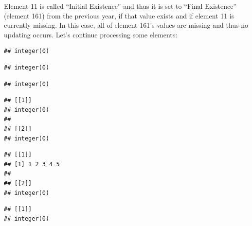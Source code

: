\documentclass[nojss]{jss}
\begin{document}
Element 11 is called ``Initial Existence'' and thus it is set to
``Final Existence'' (element 161) from the previous year, if that value exists
and if element 11 is currently missing.  In this case, all of element 161's
values are missing and thus no updating occurs.  Let's continue processing some
elements:

\begin{knitrout}
\color{fgcolor}\begin{kframe}
\begin{alltt}
\hlstd{(}   
\end{alltt}
\begin{verbatim}
## integer(0)
\end{verbatim}
\begin{alltt}
\hlstd{(}   
\end{alltt}
\begin{verbatim}
## integer(0)
\end{verbatim}
\begin{alltt}
\hlstd{(}   
\end{alltt}
\begin{verbatim}
## integer(0)
\end{verbatim}
\begin{alltt}
\hlstd{(}   
\end{alltt}
\begin{verbatim}
## [[1]]
## integer(0)
## 
## [[2]]
## integer(0)
\end{verbatim}
\begin{alltt}
\hlstd{(}   
\end{alltt}
\begin{verbatim}
## [[1]]
## [1] 1 2 3 4 5
## 
## [[2]]
## integer(0)
\end{verbatim}
\begin{alltt}
\hlstd{(}   
\end{alltt}
\begin{verbatim}
## [[1]]
## integer(0)

\end{verbatim}
\end{kframe}
\end{knitrout}
\end{document}
